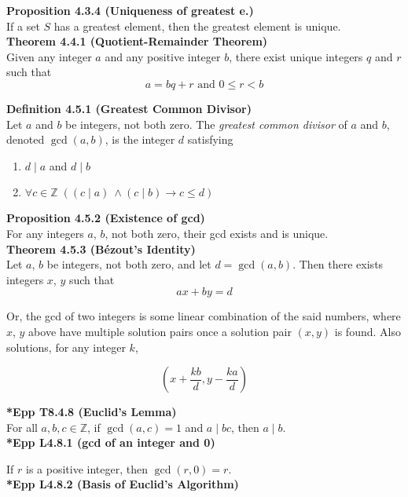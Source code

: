 \documentclass[a4paper]{article}
\newcommand{\subheading}[1]{{\scriptsize\textbf{#1}}}
\newcommand\divides{\;|\;}
\begin{document}
\begin{multicols*}{4}
\subheading{Proposition 4.3.4 (Uniqueness of greatest e.)}\\
If a set $S$ has a greatest element, then the greatest element is unique.\\

\subheading{Theorem 4.4.1 (Quotient-Remainder Theorem)}\\
Given any integer $a$ and any positive integer $b$, there exist unique integers
$q$ and $r$ such that $$ a = bq + r \text{ and } 0 \leq r < b$$

\subheading{Definition 4.5.1 (Greatest Common Divisor)}\\
Let $a$ and $b$ be integers, not both zero. The \textit{greatest common divisor}
of $a$ and $b$, denoted $\gcd(a, b)$, is the integer $d$ satisfying

\begin{enumerate} \itemsep -0.5em
  \item $d \divides a$ and $d \divides b$
  \item $\forall c \in \mathbb{Z}\;((c \divides a)\ \land (c \divides b)
    \rightarrow c \leq d)$
\end{enumerate}

\subheading{Proposition 4.5.2 (Existence of gcd)}\\
For any integers $a$, $b$, not both zero, their gcd exists and is unique.\\

\subheading{Theorem 4.5.3 (B\'ezout's Identity)}\\
Let $a$, $b$ be integers, not both zero, and let $d = \gcd(a, b)$. Then
there exists integers $x$, $y$ such that $$ax + by = d$$

Or, the gcd of two integers is some linear combination of the said numbers,
where $x$, $y$ above have multiple solution pairs once a solution pair $(x, y)$
is found. Also solutions, for any integer $k$,

$$ (x+\frac{kb}{d}, y-\frac{ka}{d}) $$

\subheading{*Epp T8.4.8 (Euclid's Lemma)}\\
For all $a, b, c \in \mathbb{Z}$, if $\gcd(a, c) = 1$ and $a \divides bc$,
then $a \divides b$.\\

\subheading{*Epp L4.8.1 (gcd of an integer and 0)}

If $r$ is a positive integer, then $\gcd(r, 0) = r$.\\

\subheading{*Epp L4.8.2 (Basis of Euclid's Algorithm)}


\end{multicols*}
\end{document}
